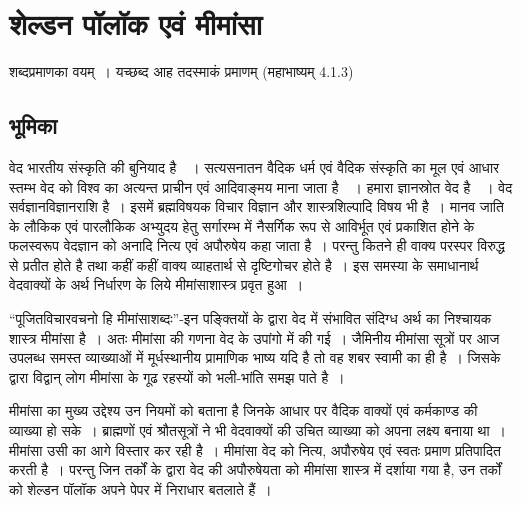 
\chapter{शेल्डन पॉलॉक एवं मीमांसा}\label{chapter3}


\begin{flushright}
\textit{}
\end{flushright}

\bgroup

\selectdev

\bigskip

\centerline{शब्दप्रमाणका वयम्~। यच्छब्द आह तदस्माकं प्रमाणम् (महाभाष्यम् 4.1.3)}

\vspace{-.5cm}

\section*{भूमिका}

वेद भारतीय संस्कृति की बुनियाद है~~। सत्यसनातन वैदिक धर्म एवं वैदिक संस्कृति का मूल एवं आधार स्तम्भ वेद को विश्व का अत्यन्त प्राचीन एवं आदिवाङ्मय माना जाता है~~। हमारा ज्ञानस्रोत वेद है~~। वेद सर्वज्ञानविज्ञानराशि है~। इसमें ब्रह्मविषयक विचार विज्ञान और शास्त्रशिल्पादि विषय भी है~। मानव जाति के लौकिक एवं पारलौकिक अभ्युदय हेतु सर्गारम्भ में नैसर्गिक रूप से आविर्भूत एवं प्रकाशित होने के फलस्वरूप वेदज्ञान को अनादि नित्य एवं अपौरुषेय कहा जाता है~। परन्तु कितने ही वाक्य परस्पर विरुद्ध से प्रतीत होते है तथा कहीं कहीं वाक्य व्याहतार्थ से दृष्टिगोचर होते है~। इस समस्या के समाधानार्थ वेदवाक्यों के अर्थ निर्धारण के लिये मीमांसाशास्त्र प्रवृत हुआ~।

“पूजितविचारवचनो हि मीमांसाशब्दः”-इन पङ्क्तियों के द्वारा वेद में संभावित संदिग्ध अर्थ का निश्चायक शास्त्र मीमांसा है~। अतः मीमांसा की गणना वेद के उपांगो में की गई~। जैमिनीय मीमांसा सूत्रों पर आज उपलब्ध समस्त व्याख्याओं में मूर्धस्थानीय प्रामाणिक भाष्य यदि है तो वह शबर स्वामी का ही है~। जिसके द्वारा विद्वान् लोग मीमांसा के गूढ रहस्यों को भली-भांति समझ पाते है~। 

मीमांसा का मुख्य उद्देश्य उन नियमों को बताना है जिनके आधार पर वैदिक वाक्यों एवं कर्मकाण्ड की व्याख्या हो सके~। ब्राह्मणों एवं श्रौतसूत्रों ने भी वेदवाक्यों की उचित व्याख्या को अपना लक्ष्य बनाया था~। मीमांसा उसी का आगे विस्तार कर रही है~। मीमांसा वेद को नित्य, अपौरुषेय एवं स्वतः प्रमाण प्रतिपादित करती है~। परन्तु जिन तर्कों के द्वारा वेद की अपौरुषेयता को मीमांसा शास्त्र में दर्शाया गया है, उन तर्कों को शेल्डन पॉलॉक अपने पेपर  में निराधार बतलाते हैं~।

